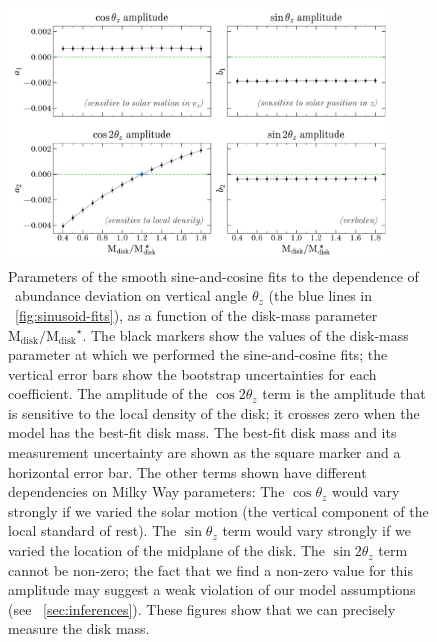 \documentclass[modern]{aastex63}
\newcommand{\mdisk}{\ensuremath{\mathrm{M}_\mathrm{disk}}}
\newcommand{\mratio}{\ensuremath{\mdisk / \mdisk^\star}}
\begin{document}
\begin{figure}[!tp] %
  \begin{mdframed}
  \begin{center}
  \includegraphics[width=0.9\textwidth]{coeff-vs-mdisk.pdf}
  \end{center}
  \caption{%
    Parameters of the smooth sine-and-cosine fits to the dependence of \mgfe\
    abundance deviation on vertical angle $\theta_z$ (the blue lines in
    \figurename~\ref{fig:sinusoid-fits}), as a function of the disk-mass
    parameter \mratio.
    The black markers show the values of the disk-mass parameter at which we
    performed the sine-and-cosine fits; the vertical error bars show the
    bootstrap uncertainties for each coefficient.
    The amplitude of the $\cos 2\theta_z$ term is the amplitude that is
    sensitive to the local density of the disk; it crosses zero when the model
    has the best-fit disk mass.
    The best-fit disk mass and its measurement uncertainty are shown as the
    square marker and a horizontal error bar.
    The other terms shown have different dependencies on Milky Way parameters:
    The $\cos\theta_z$ would vary strongly if we varied the solar motion (the
    vertical component of the local standard of rest).
    The $\sin\theta_z$ term would vary strongly if we varied the location of the
    midplane of the disk.
    The $\sin 2\theta_z$ term cannot be non-zero; the fact that we find a
    non-zero value for this amplitude may suggest a weak violation of our model
    assumptions (see \sectionname~\ref{sec:inferences}).
    These figures show that we can precisely measure the disk mass.
  \label{fig:coeff-mdisk}
  }
  \end{mdframed}
\end{figure}
\end{document}
